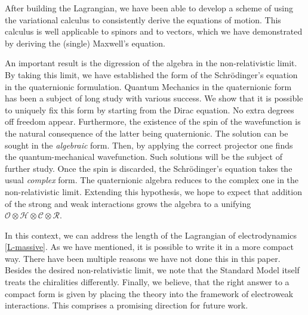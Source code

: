 \documentclass[epsfig,12pt]{article}
\newcommand{\cR}{\mathcal{R}}
\newcommand{\cC}{\mathcal{C}}
\newcommand{\cH}{\mathcal{H}}
\newcommand{\cO}{\mathcal{O}}
\begin{document}
	After building the Lagrangian, we have been able to develop a scheme of using the variational calculus
	to consistently derive the equations of motion.
	This calculus is well applicable to spinors and to vectors, which we have demonstrated by deriving the
	(single) Maxwell's equation.
	
	An important result is the digression of the algebra in the non-relativistic limit.
	By taking this limit, we have established the form of the Schr\"odinger's equation
	in the quaternionic formulation.
	Quantum Mechanics in the quaternionic form has been a subject of long study with various success.
	We show that it is possible to uniquely fix this form by starting from the Dirac equation.
	No extra degrees off freedom appear.
	Furthermore, the existence of the spin of the wavefunction is the natural consequence of the latter
	being quaternionic.
	The solution can be sought in the \emph{algebraic} form.
	Then, by applying the correct projector one finds the quantum-mechanical wavefunction.
	Such solutions will be the subject of further study.
	Once the spin is discarded, the Schr\"odinger's equation takes the usual \emph{complex}
	form.
	The quaternionic algebra reduces to the complex one in the non-relativistic limit.
	Extending this hypothesis, we hope to expect that addition of the strong and weak interactions
	grows the algebra to a unifying $ \cO \otimes \cH \otimes \cC \otimes \cR $.

	In this context, we can address the length of the Lagrangian of electrodynamics \eqref{L-massive}.
	As we have mentioned, it is possible to write it in a more compact way.
	There have been multiple reasons we have not done this in this paper.
	Besides the desired non-relativistic limit, we note that the Standard Model itself treats
	the chiralities differently.
	Finally, we believe, that the right answer to a compact form is given by placing the theory
	into the framework of electroweak interactions.
	This comprises a promising direction for future work.




\end{document}

